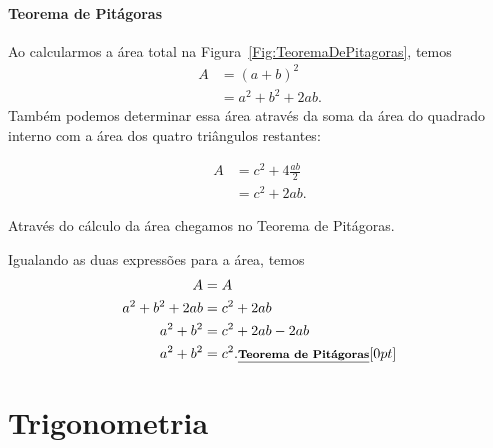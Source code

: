 \paragraph{Teorema de Pitágoras}

Ao calcularmos a área total na Figura~\ref{Fig:TeoremaDePitagoras}, temos
\begin{align}
    A &= (a+b)^2 \\
    &= a^2 + b^2 + 2ab.
\end{align}
%
Também podemos determinar essa área através da soma da área do quadrado interno com a área dos quatro triângulos restantes:

\begin{align}
    A &= c^2 + 4 \frac{ab}{2} \\
    &= c^2 + 2ab.
\end{align}
\begin{marginfigure}[-4cm]
\centering
{}
\caption{Através do cálculo da área chegamos no Teorema de Pitágoras. \label{Fig:TeoremaDePitagoras}}
\end{marginfigure}

\noindent{}Igualando as duas expressões para a área, temos
\begin{align}
    A &= A \\
    a^2 + b^2 + 2ab &= c^2 + 2ab \\
    a^2 + b^2 &= c^2 + 2ab - 2ab \\
    a^2 + b^2 &= c^2. \relax{\footnotesize\emph{\textbf{Teorema de Pitágoras}}}[0pt]
\end{align}


\section{Trigonometria}

